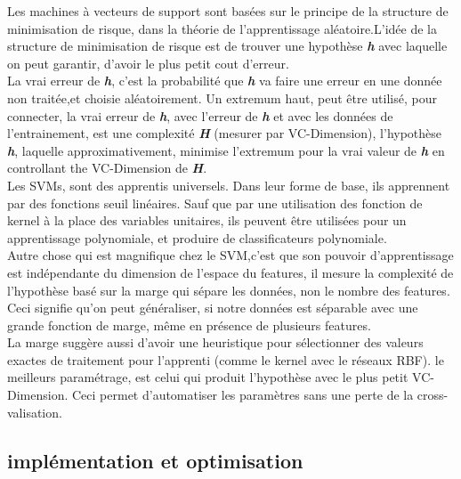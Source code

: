 Les machines à vecteurs de support sont basées sur le principe de la structure de minimisation de risque, dans la théorie de l'apprentissage aléatoire.L'idée de la structure de minimisation de risque est de trouver une hypothèse \textbf{\textit{h}} avec laquelle on peut garantir, d'avoir le plus petit cout d'erreur. \\
La vrai erreur de \textbf{\textit{h}}, c'est la probabilité que \textbf{\textit{h}} va faire une erreur en une donnée non traitée,et choisie aléatoirement. Un extremum haut, peut être utilisé, pour connecter, la vrai erreur de \textbf{\textit{h}}, avec l'erreur de \textbf{\textit{h}} et avec les données de  l'entrainement, est une complexité \textbf{\textit{H}} (mesurer par VC-Dimension), l'hypothèse \textbf{\textit{h}}, laquelle approximativement, minimise l'extremum pour la vrai valeur de \textbf{\textit{h}} en controllant the VC-Dimension de \textbf{\textit{H}}. \\[0.2cm]
Les SVMs, sont des apprentis universels. Dans leur forme de base, ils apprennent par  des fonctions seuil linéaires. Sauf que par une utilisation des fonction de kernel à la place des variables unitaires, ils peuvent être utilisées pour un apprentissage polynomiale, et produire de classificateurs polynomiale.\\[0.2cm]
Autre chose qui est magnifique chez le SVM,c'est que son pouvoir d'apprentissage est indépendante du dimension de l'espace du features, il mesure la complexité de l'hypothèse basé sur la marge qui sépare les données, non le nombre des features. Ceci signifie qu'on peut généraliser, si notre données est séparable avec une grande fonction de marge, même en présence de plusieurs features.\\[0.2cm]
La marge suggère aussi d'avoir une heuristique pour sélectionner des valeurs exactes de traitement pour l'apprenti (comme le kernel avec le réseaux RBF). le meilleurs paramétrage, est celui qui produit l'hypothèse avec le plus petit VC-Dimension. Ceci permet d'automatiser les paramètres sans une perte de la cross-valisation.
\subsection{implémentation et optimisation}


